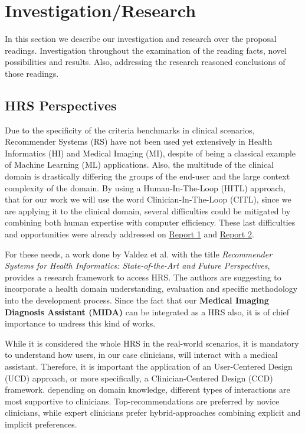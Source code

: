 \section{Investigation/Research}

In this section we describe our investigation and research over the proposal readings. Investigation throughout the examination of the reading facts, novel possibilities and results. Also, addressing the research reasoned conclusions of those readings.

\subsection{HRS Perspectives}

Due to the specificity of the criteria benchmarks in clinical scenarios, Recommender Systems (RS) have not been used yet extensively in Health Informatics (HI) and Medical Imaging (MI), despite of being a classical example of Machine Learning (ML) applications. Also, the multitude of the clinical domain is drastically differing the groups of the end-user and the large context complexity of the domain. By using a Human-In-The-Loop (HITL) approach, that for our work we will use the word Clinician-In-The-Loop (CITL), since we are applying it to the clinical domain, several difficulties could be mitigated by combining both human expertise with computer efficiency. These last difficulties and opportunities were already addressed on \href{https://github.com/mida-project/reading-reports/blob/master/state-of-the-art/report_1/main.pdf}{Report 1} and \href{https://github.com/mida-project/reading-reports/blob/master/state-of-the-art/report_2/main.pdf}{Report 2}.

For these needs, a work done by Valdez et al. \cite{valdez2016recommender} with the title \textit{Recommender Systems for Health Informatics: State-of-the-Art and Future Perspectives}, provides a research framework to access HRS. The authors are suggesting to incorporate a health domain understanding, evaluation and specific methodology into the development process. Since the fact that our \textbf{Medical Imaging Diagnosis Assistant (MIDA)} can be integrated as a HRS also, it is of chief importance to undress this kind of works.

While it is considered the whole HRS in the real-world scenarios, it is mandatory to understand how users, in our case clinicians, will interact with a medical assistant. Therefore, it is important the application of an User-Centered Design (UCD) approach, or more specifically, a Clinician-Centered Design (CCD) framework. depending on domain knowledge, different types of interactions are most supportive to clinicians. Top-recommendations are preferred by novice clinicians, while expert clinicians prefer hybrid-approaches combining explicit and implicit preferences.

